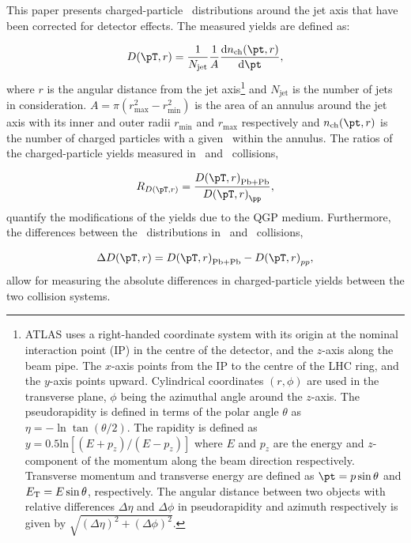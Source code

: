 This paper presents charged-particle \pt\ distributions around the jet axis that have been corrected for detector effects.
The measured yields are defined as:

\begin{align*}
\Dptr = \frac{1}{N_{\mathrm{jet}}} \frac{1}{A} \frac{\mathrm{d} n_{\mathrm{ch}} (\pt, r)}{\mathrm{d} \pt},
\end{align*}
where $r$ is the angular distance from the jet axis\footnote{ATLAS uses a right-handed coordinate system with its origin at the nominal interaction point (IP) in the centre of the detector, and the $z$-axis along the beam pipe.
The $x$-axis points from the IP to the centre of the LHC ring, and the $y$-axis points upward.
Cylindrical coordinates $(r,\phi)$ are used in the transverse plane, $\phi$ being the azimuthal angle around the $z$-axis.
The pseudorapidity is defined in terms of the polar angle $\theta$ as $\eta=-\ln\tan(\theta/2)$.
The rapidity is defined as $y = 0.5\text{ln}[(E + p_z)/(E-p_z)]$ where $E$ and $p_z$ are the energy and $z$-component of the momentum along the beam direction respectively.
Transverse momentum and transverse energy are defined as $\pt = p \sin\theta$ and $\mbox{$E_{\mathrm{T}}$} = E \sin\theta$, respectively.
The angular distance between two objects with relative differences $\Delta \eta$ and $\Delta \phi$ in pseudorapidity and azimuth respectively is given by $\sqrt{(\Delta \eta )^2 + (\Delta \phi)^2}$.}
 and $N_{\mathrm{jet}}$ is the number of jets in consideration.
$A = \pi (r_{\mathrm{max}}^2 - r_{\mathrm{min}}^2) $ is the area of an annulus around the jet axis with its inner and outer radii $r_{\mathrm{min}}$ and $r_{\mathrm{max}}$ respectively and $n_{\mathrm{ch}}(\pt, r)$ is the number of charged particles with a given \pt\ within the annulus.
The ratios of the charged-particle yields measured in \pbpb\ and \pp\ collisions,

\begin{align*}
   \RDptr = \frac{\Dptr_\mathrm{Pb+Pb}}{\Dptr_{\pp}},
\end{align*}
quantify the modifications of the yields due to the QGP medium.
Furthermore, the differences between the \Dptr\ distributions in \pbpb\ and \pp\ collisions, 

\begin{align*}
   \Delta \Dptr = \Dptr_\mathrm{Pb+Pb} - \Dptr_{pp},
\end{align*}
allow for measuring the absolute differences in charged-particle yields between the two collision systems.



